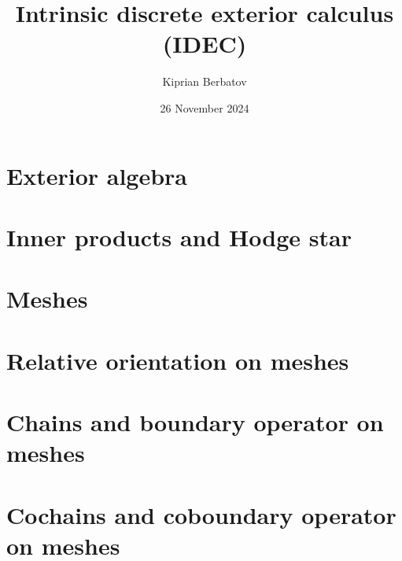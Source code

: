 \documentclass[fleqn]{article}
\title{Intrinsic discrete exterior calculus (IDEC)}
\author{Kiprian Berbatov}
\date{26 November 2024}
\theoremstyle{definition}
\begin{document}
\maketitle

\tableofcontents

\section{Exterior algebra}
\label{section:exterior_algebra}


\section{Inner products and Hodge star}
\label{section:inner_products_and_hodge_star}


\section{Meshes}
\label{section:meshes}


\section{Relative orientation on meshes}
\label{section:relative_orientation_on_meshes}





\section{Chains and boundary operator on meshes}
\label{section:chains_and_boundary_operator_on_meshes}








\section{Cochains and coboundary operator on meshes}
\label{section:cochains_and_coboundary_operator_on_meshes}




\end{document}
